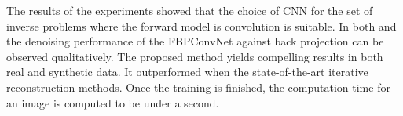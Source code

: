 \documentclass[journal, onecolumn, 11pt]{IEEEtran}
\begin{document}
The results of the experiments showed that the choice of CNN for the set of inverse problems where the forward model is convolution is suitable. In both  and  the denoising performance of the FBPConvNet against back projection can be observed qualitatively. The proposed method yields compelling results in both real and synthetic data. It outperformed when the state-of-the-art iterative reconstruction methods. Once the training is finished, the computation time for an image is computed to be under a second. 

\printbibliography
\end{document}
